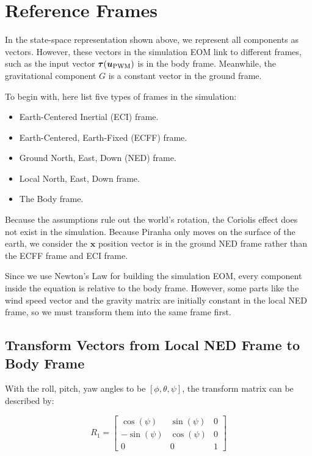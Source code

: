 \section{Reference Frames}

In the state-space representation shown above, we represent all components as vectors. However, these vectors in the simulation EOM link to different frames, such as the input vector $\boldsymbol{\tau}(\boldsymbol{u}_{\rm PWM})$ is in the body frame. Meanwhile, the gravitational component $G$ is a constant vector in the ground frame.

To begin with, here list five types of frames in the simulation:

\begin{itemize}
    \item Earth-Centered Inertial (ECI) frame.
    \item Earth-Centered, Earth-Fixed (ECFF) frame.
    \item Ground North, East, Down (NED) frame.
    \item Local North, East, Down frame.
    \item The Body frame.
\end{itemize}

Because the assumptions rule out the world's rotation, the Coriolis effect does not exist in the simulation. Because Piranha only moves on the surface of the earth, we consider the $\boldsymbol{x}$ position vector is in the ground NED frame rather than the ECFF frame and ECI frame.

Since we use Newton's Law for building the simulation EOM, every component inside the equation is relative to the body frame. However, some parts like the wind speed vector and the gravity matrix are initially constant in the local NED frame, so we must transform them into the same frame first.

\subsection{Transform Vectors from Local NED Frame to Body Frame}

With the roll, pitch, yaw angles to be $[\phi, \theta, \psi]$, the transform matrix can be described by:

\begin{equation}
    R_1=\left[\begin{array}{rrr}
        \cos(\psi) & \sin(\psi) & 0  \\
        -\sin(\psi) & \cos(\psi) & 0 \\
        0 & 0 & 1 
    \end{array}\right]
\end{equation}

